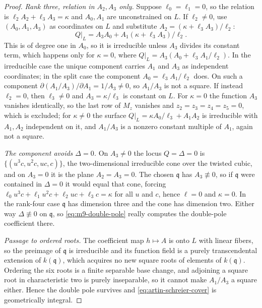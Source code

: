 \begin{proof}
\emph{Rank three, relation in $A_2,A_3$ only.}  Suppose $\ell_0=\ell_1=0$, so
the relation is $\ell_2A_2+\ell_3A_3=\kappa$ and $A_0,A_1$ are unconstrained
on $L$.  If $\ell_2\neq0$, use $(A_0,A_1,A_3)$ as coordinates on $L$ and
substitute $A_2=(\kappa+\ell_3A_3)/\ell_2$:
\[
 Q|_L=A_3A_0+A_1(\kappa+\ell_3A_3)/\ell_2 .
\]
This is of degree one in $A_0$, so it is irreducible unless $A_3$ divides its
constant term, which happens only for $\kappa=0$, where
$Q|_L=A_3(A_0+\ell_3A_1/\ell_2)$.  In the irreducible case the unique
component carries $A_1$ and $A_3$ as independent coordinates; in the split
case the component $A_0=\ell_3A_1/\ell_2$ does.  On such a component
$\partial(A_1/A_3)/\partial A_1=1/A_3\neq0$, so $A_1/A_3$ is not a square.
If instead $\ell_2=0$, then $\ell_3\neq0$ and $A_3=\kappa/\ell_3$ is constant
on $L$.  For $\kappa=0$ the function $A_3$ vanishes identically, so the last
row of $M_z$ vanishes and $z_2=z_3=z_4=z_5=0$, which is excluded; for
$\kappa\neq0$ the surface $Q|_L=\kappa A_0/\ell_3+A_1A_2$ is irreducible with
$A_1,A_2$ independent on it, and $A_1/A_3$ is a nonzero constant multiple of
$A_1$, again not a square.

\emph{The component avoids $\Delta=0$.}  On $A_3\neq0$ the locus $Q=\Delta=0$
is $\{(u^3c,u^2c,uc,c)\}$, the two-dimensional irreducible cone over the
twisted cubic, and on $A_3=0$ it is the plane $A_2=A_3=0$.  The chosen
$\mathfrak q$ has $A_3\not\equiv0$, so if $\mathfrak q$ were contained in
$\Delta=0$ it would equal that cone, forcing
$\ell_0u^3c+\ell_1u^2c+\ell_2uc+\ell_3c=\kappa$ for all $u$ and $c$, hence
$\ell=0$ and $\kappa=0$.  In the rank-four case $\mathfrak q$ has dimension
three and the cone has dimension two.  Either way
$\Delta\not\equiv0$ on $\mathfrak q$, so \eqref{eq:m9-double-pole} really
computes the double-pole coefficient there.

\emph{Passage to ordered roots.}  The coefficient map $h\mapsto A$ is onto
$L$ with linear fibers, so the preimage of $\mathfrak q$ is irreducible and
its function field is a purely transcendental extension of
$k(\mathfrak q)$, which acquires no new square roots of elements of
$k(\mathfrak q)$.  Ordering the six roots is a finite separable base change,
and adjoining a square root in characteristic two is purely inseparable, so
it cannot make $A_1/A_3$ a square either.  Hence the double pole survives and
\eqref{eq:artin-schreier-cover} is geometrically integral.
\end{proof}

